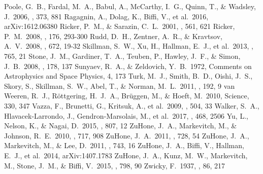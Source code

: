 \documentclass{emulateapj}
\begin{document}
\begin{thebibliography}{}
 Poole, G.~B., Fardal, M.~A., Babul, A., McCarthy, I.~G., Quinn, T., \& Wadsley, J.\ 2006, \mnras, 373, 881
 Ragagnin, A., Dolag, K., Biffi, V., et al.\ 2016, arXiv:1612.06380 
 Ricker, P.~M., \& Sarazin, C.~L.\ 2001, \apj, 561, 621
 Ricker, P.~M.\ 2008, \apjs, 176, 293-300
 Rudd, D.~H., Zentner, A.~R., \& Kravtsov, A.~V.\ 2008, \apj, 672, 19-32 
 Skillman, S.~W., Xu, H., Hallman, E.~J., et al.\ 2013, \apj, 765, 21
 Stone, J.~M., Gardiner, T.~A., Teuben, P., Hawley, J.~F., \& Simon, J.~B.\ 2008, \apjs, 178, 137
 Sunyaev, R.~A., \& Zeldovich, Y.~B.\ 1972, Comments on Astrophysics and Space Physics, 4, 173
 Turk, M.~J., Smith, B.~D., Oishi, J.~S., Skory, S., Skillman, S.~W., Abel, T., \& Norman, M.~L.\ 2011, \apjs, 192, 9
 van Weeren, R.~J., R{\"o}ttgering, H.~J.~A., Br{\"u}ggen, M., \& Hoeft, M.\ 2010, Science, 330, 347
 Vazza, F., Brunetti, G., Kritsuk, A., et al.\ 2009, \aap, 504, 33
 Walker, S.~A., Hlavacek-Larrondo, J., Gendron-Marsolais, M., et al.\ 2017, \mnras, 468, 2506 
 Yu, L., Nelson, K., \& Nagai, D.\ 2015, \apj, 807, 12
 ZuHone, J.~A., Markevitch, M., \& Johnson, R.~E.\ 2010, \apj, 717, 908
 ZuHone, J.~A.\ 2011, \apj, 728, 54
 ZuHone, J.~A., Markevitch, M., \& Lee, D.\ 2011, \apj, 743, 16
 ZuHone, J.~A., Biffi, V., Hallman, E.~J., et al.\ 2014, arXiv:1407.1783
 ZuHone, J.~A., Kunz, M.~W., Markevitch, M., Stone, J.~M., \& Biffi, V.\ 2015, \apj, 798, 90
 Zwicky, F.\ 1937, \apj, 86, 217
\end{thebibliography}{}
\end{document}
